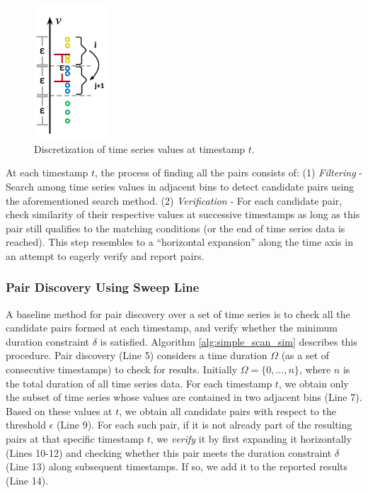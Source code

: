\begin{figure}[!tb]
    \centering
    \includegraphics[width=0.25\textwidth]{figures/index.png}
    \caption{Discretization of time series values at timestamp $t$.}
    \label{fig:index}
\end{figure}

At each timestamp $t$, the process of finding all the pairs consists of: (1) \textit{Filtering} - Search among time series values in adjacent bins to detect candidate pairs using the aforementioned search method. (2) \textit{Verification} - For each candidate pair, check similarity of their respective values at successive timestamps as long as this pair still qualifies to the matching conditions (or the end of time series data is reached). This step resembles to a ``horizontal expansion'' along the time axis in an attempt to eagerly verify and report pairs.

\subsubsection{Pair Discovery Using Sweep Line}
\label{subsec:sweep_line_join}
A baseline method for pair discovery over a set of time series is to check all the candidate pairs formed at each timestamp, and verify whether the minimum duration constraint $\delta$ is satisfied. Algorithm \ref{alg:simple_scan_sim} describes this procedure. Pair discovery (Line 5) considers a time duration $\Omega$ (as a set of consecutive timestamps) to check for results. Initially $\Omega = \{0, \dots, n\}$, where $n$ is the total duration of all time series data. For each timestamp $t$, we obtain only the subset of time series whose values are contained in two adjacent bins (Line 7). Based on these values at $t$, we obtain all candidate pairs with respect to the threshold $\epsilon$ (Line 9). For each such pair, if it is not already part of the resulting pairs at that specific timestamp $t$, we \textit{verify} it by first expanding it horizontally (Lines 10-12) and checking whether this pair meets the duration constraint $\delta$ (Line 13) along subsequent timestamps. If so, we add it to the reported results (Line 14).

